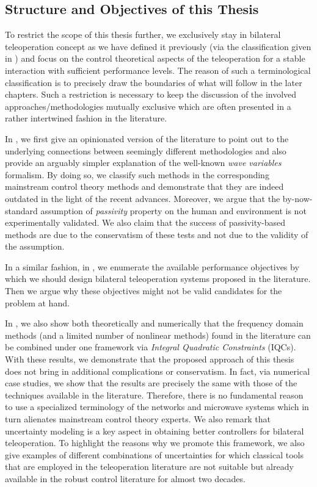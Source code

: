 \subsection{Structure and Objectives of this Thesis}
To restrict the scope of this thesis further, we exclusively stay in bilateral teleoperation concept as we have defined it previously (via 
the classification given in ) and focus on the control theoretical aspects of the teleoperation for a stable 
interaction with sufficient performance levels. The reason of such a terminological classification is to precisely draw the boundaries of 
what will follow in the later chapters. Such a restriction is necessary to keep the discussion of the involved approaches/methodologies 
mutually exclusive which are often presented in a rather intertwined fashion in the literature.

In , we first give an opinionated version of the literature to point out to the underlying connections between 
seemingly different methodologies and also provide an arguably simpler explanation of the well-known \emph{wave variables} formalism. By 
doing so, we classify such methods in the corresponding mainstream control theory methods and demonstrate that they are indeed outdated in 
the light of the recent advances. Moreover, we argue that the by-now-standard assumption of \emph{passivity} property on the human and 
environment is not experimentally validated. We also claim that the success of passivity-based methods are due to the conservatism 
of these tests and not due to the validity of the assumption.

In a similar fashion, in , we enumerate the available performance objectives by which we should design bilateral 
teleoperation systems proposed in the literature. Then we argue why these objectives might not be valid candidates for the problem at hand.

In , we also show both theoretically and numerically that the frequency domain methods (and a limited number of 
nonlinear methods) found in the literature can be combined under one framework via \emph{Integral Quadratic Constraints} (IQCs). With these 
results, we demonstrate that the proposed approach of this thesis does not bring in additional complications or conservatism. In fact, 
via numerical case studies, we show that the results are precisely the same with those of the techniques available in the literature.
Therefore, there is no fundamental reason to use a specialized terminology of the networks and microwave systems which in turn alienates 
mainstream control theory experts. We also remark that uncertainty modeling is a key aspect in obtaining better controllers for bilateral 
teleoperation. To highlight the reasons why we promote this framework, we also give examples of different combinations of uncertainties 
for which classical tools that are employed in the teleoperation literature are not suitable but already available in the robust control 
literature for almost two decades. 


